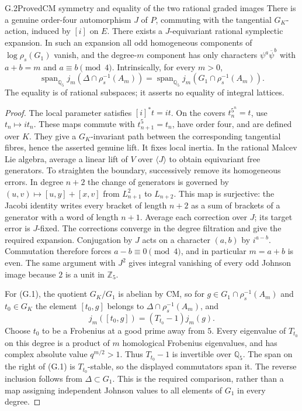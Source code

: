 \begin{statement}{G.2}{Proved}{CM symmetry and equality of the two rational graded images}
There is a genuine order-four automorphism $J$ of $P$, commuting with
the tangential $G_K$-action, induced by $[i]$ on $E$.
There exists a $J$-equivariant rational symplectic expansion. In such an
expansion all odd homogeneous components of $\log\rho_s(G_1)$ vanish,
and the degree-$m$ component has only characters
$\psi^a\overline\psi^b$ with $a+b=m$ and $a\equiv b\pmod4$.
Intrinsically, for every $m>0$,
\[
 \operatorname{span}_{\mathbb Q_5}j_m(\Delta\cap\rho_s^{-1}(A_m))
 =\operatorname{span}_{\mathbb Q_5}j_m(G_1\cap\rho_s^{-1}(A_m)).
 \tag{G.1}
\]
The equality is of rational subspaces; it asserts no equality of integral
lattices.
\end{statement}
\begin{proof}
The local parameter satisfies $[i]^*t=it$. On the covers
$t_n^{5^n}=t$, use $t_n\mapsto it_n$. These maps commute with
$t_{n+1}^5=t_n$, have order four, and are defined over $K$.
They give a $G_K$-invariant path between the corresponding tangential
fibres, hence the asserted genuine lift. It fixes local inertia.
In the rational Malcev Lie algebra, average a linear lift of $V$ over
$\langle J\rangle$ to obtain equivariant free generators. To straighten
the boundary, successively remove its homogeneous errors. In degree
$n+2$ the change of generators is governed by
$(u,v)\mapsto[u,y]+[x,v]$ from $L_{n+1}^2$ to $L_{n+2}$.
This map is surjective: the Jacobi identity writes every bracket of
length $n+2$ as a sum of brackets of a generator with a word of length
$n+1$. Average each correction over $J$; its target error is $J$-fixed.
The corrections converge in the degree filtration and give the required
expansion. Conjugation by $J$ acts on a character $(a,b)$ by $i^{a-b}$.
Commutation therefore forces $a-b\equiv0\pmod4$, and in particular
$m=a+b$ is even. The same argument with $J^2$ gives integral vanishing
of every odd Johnson image because $2$ is a unit in $\mathbb Z_5$.

For (G.1), the quotient $G_K/G_1$ is abelian by CM, so for
$g\in G_1\cap\rho_s^{-1}(A_m)$ and $t_0\in G_K$ the element
$[t_0,g]$ belongs to $\Delta\cap\rho_s^{-1}(A_m)$, and
\[
 j_m([t_0,g])=(T_{t_0}-1)j_m(g).
\]
Choose $t_0$ to be a Frobenius at a good prime away from $5$.
Every eigenvalue of $T_{t_0}$ on this degree is a product of $m$
homological Frobenius eigenvalues, and has complex absolute value
$q^{m/2}>1$. Thus $T_{t_0}-1$ is invertible over $\mathbb Q_5$.
The span on the right of (G.1) is $T_{t_0}$-stable, so the displayed
commutators span it. The reverse inclusion follows from $\Delta\subset
G_1$. This is the required comparison, rather than a map assigning
independent Johnson values to all elements of $G_1$ in every degree.
\end{proof}


